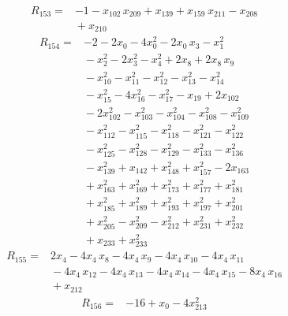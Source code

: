 \documentclass[11pt]{article}
\begin{document}
\begin{equation*}\begin{aligned}
R_{153}={}&-1 - x_{102}\,x_{209} + x_{139} + x_{159}\,x_{211} - x_{208} \\
&{} + x_{210}
\end{aligned}\end{equation*}
\begin{equation*}\begin{aligned}
R_{154}={}&-2 - 2x_{0} - 4x_{0}^{2} - 2x_{0}\,x_{3} - x_{1}^{2} \\
&{} - x_{2}^{2} - 2x_{3}^{2} - x_{4}^{2} + 2x_{8} + 2x_{8}\,x_{9} \\
&{} - x_{10}^{2} - x_{11}^{2} - x_{12}^{2} - x_{13}^{2} - x_{14}^{2} \\
&{} - x_{15}^{2} - 4x_{16}^{2} - x_{17}^{2} - x_{19} + 2x_{102} \\
&{} - 2x_{102}^{2} - x_{103}^{2} - x_{104}^{2} - x_{108}^{2} - x_{109}^{2} \\
&{} - x_{112}^{2} - x_{115}^{2} - x_{118}^{2} - x_{121}^{2} - x_{122}^{2} \\
&{} - x_{125}^{2} - x_{128}^{2} - x_{129}^{2} - x_{133}^{2} - x_{136}^{2} \\
&{} - x_{139}^{2} + x_{142} + x_{148}^{2} + x_{157}^{2} - 2x_{163} \\
&{} + x_{163}^{2} + x_{169}^{2} + x_{173}^{2} + x_{177}^{2} + x_{181}^{2} \\
&{} + x_{185}^{2} + x_{189}^{2} + x_{193}^{2} + x_{197}^{2} + x_{201}^{2} \\
&{} + x_{205}^{2} - x_{209}^{2} - x_{212}^{2} + x_{231}^{2} + x_{232}^{2} \\
&{} + x_{233} + x_{233}^{2}
\end{aligned}\end{equation*}
\begin{equation*}\begin{aligned}
R_{155}={}&2x_{4} - 4x_{4}\,x_{8} - 4x_{4}\,x_{9} - 4x_{4}\,x_{10} - 4x_{4}\,x_{11} \\
&{} - 4x_{4}\,x_{12} - 4x_{4}\,x_{13} - 4x_{4}\,x_{14} - 4x_{4}\,x_{15} - 8x_{4}\,x_{16} \\
&{} + x_{212}
\end{aligned}\end{equation*}
\begin{equation*}\begin{aligned}
R_{156}={}&-16 + x_{0} - 4x_{213}^{2}
\end{aligned}\end{equation*}
\end{document}
